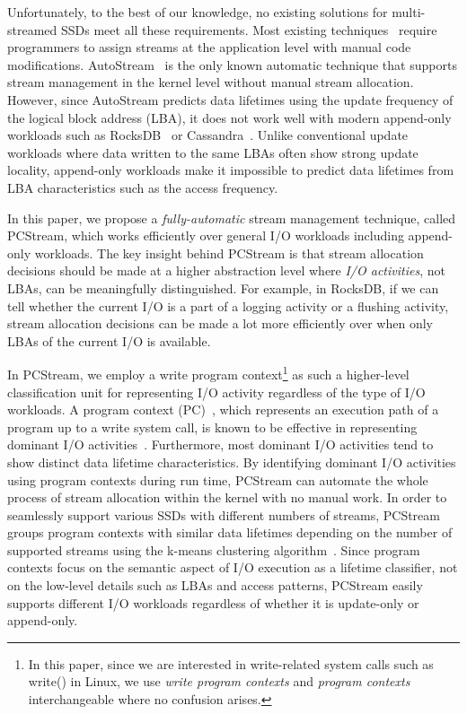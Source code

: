 Unfortunately, to the best of our knowledge, no existing solutions  for
multi-streamed SSDs meet all these requirements.  
Most existing techniques~\cite{MultiStream, Level, FStream, vStream} require 
programmers to assign streams at the application level with manual code modifications.
\textsf{\small AutoStream}~\cite{AutoStream} is the only known automatic technique 
that supports stream management in the kernel level without manual stream allocation.
However, since \textsf{\small AutoStream} predicts data lifetimes using the update frequency 
of the logical block address (LBA), it does not work well with modern append-only workloads 
such as RocksDB~\cite{RocksDB} or Cassandra~\cite{Cassandra}.  
Unlike conventional update workloads where data written to the same LBAs 
often show strong update locality, 
append-only workloads make it impossible to predict data lifetimes 
from LBA characteristics such as the access frequency.

In this paper, we propose a {\it fully-automatic} stream management technique, 
called \textsf{\small PCStream}, which works efficiently over general I/O workloads including 
append-only workloads.   
The key insight behind \textsf{\small PCStream} is that stream allocation decisions should be made 
at a higher abstraction level where {\it I/O activities}, not LBAs, can be meaningfully distinguished.
For example, in RocksDB, if we can tell whether the current I/O is a part of 
a logging activity or a flushing activity, stream allocation decisions can be made 
a lot more efficiently over when only LBAs of the current I/O is
available.   

In \textsf{\small PCStream}, we employ a write program context\footnote{In this paper, since we are 
interested in write-related system calls such as write() in Linux, 
we use {\it write program contexts} and {\it
program contexts} interchangeable where no confusion arises.} as such a higher-level 
classification unit for representing I/O activity regardless of the type of I/O workloads. 
A program context (PC)~\cite{PC, PC2}, which represents an execution path of a program 
up to a write system call,
is known to be effective in 
representing dominant I/O activities~\cite{PCHa}.  
Furthermore, most dominant I/O activities tend to show distinct data lifetime characteristics.
By identifying dominant I/O activities using program contexts during run time, 
\textsf{\small PCStream} can automate the whole process of stream allocation within the 
kernel with no manual work.  In order to
seamlessly support various SSDs with different numbers of streams, \textsf{\small PCStream} 
groups program contexts with similar data lifetimes 
depending on the number of supported streams
using the k-means clustering algorithm~\cite{kmeans}. 
Since program contexts focus on the semantic aspect of I/O execution as a lifetime
classifier, not on the low-level details such as LBAs and access patterns, 
\textsf{\small PCStream} easily 
supports different I/O workloads regardless of whether it is update-only or append-only.   

